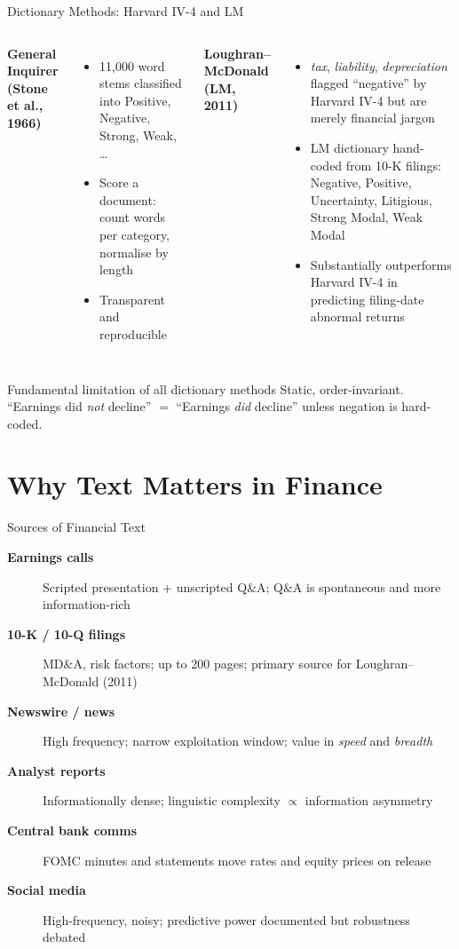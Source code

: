 \documentclass[9pt,t]{beamer}
\begin{document}
\begin{frame}{Dictionary Methods: Harvard IV-4 and LM}
  \begin{columns}
    \textbf{General Inquirer (Stone et al., 1966)}
    \begin{itemize}
      \item 11,000 word stems classified into Positive, Negative, Strong, Weak, \ldots
      \item Score a document: count words per category, normalise by length
      \item Transparent and reproducible
    \end{itemize}
    \textbf{Loughran--McDonald (LM, 2011)}
    \begin{itemize}
      \item \textit{tax}, \textit{liability}, \textit{depreciation} flagged ``negative'' by Harvard IV-4 but are merely financial jargon
      \item LM dictionary hand-coded from 10-K filings: Negative, Positive, Uncertainty, Litigious, Strong Modal, Weak Modal
      \item Substantially outperforms Harvard IV-4 in predicting filing-date abnormal returns
    \end{itemize}
  \end{columns}
  \medskip
  \begin{alertblock}{Fundamental limitation of all dictionary methods}
    Static, order-invariant.
    ``Earnings did \emph{not} decline'' $=$ ``Earnings \emph{did} decline'' unless negation is hard-coded.
  \end{alertblock}
\end{frame}

\section{Why Text Matters in Finance}

\begin{frame}{Sources of Financial Text}
  \begin{description}
    \item[\textbf{Earnings calls}] Scripted presentation + unscripted Q\&A;
          Q\&A is spontaneous and more information-rich
    \item[\textbf{10-K / 10-Q filings}] MD\&A, risk factors; up to 200 pages;
          primary source for Loughran--McDonald (2011)
    \item[\textbf{Newswire / news}] High frequency; narrow exploitation window; value in \emph{speed} and \emph{breadth}
    \item[\textbf{Analyst reports}] Informationally dense; linguistic complexity $\propto$ information asymmetry
    \item[\textbf{Central bank comms}] FOMC minutes and statements move rates and equity prices on release
    \item[\textbf{Social media}] High-frequency, noisy; predictive power documented but robustness debated
  \end{description}
\end{frame}
\end{document}
